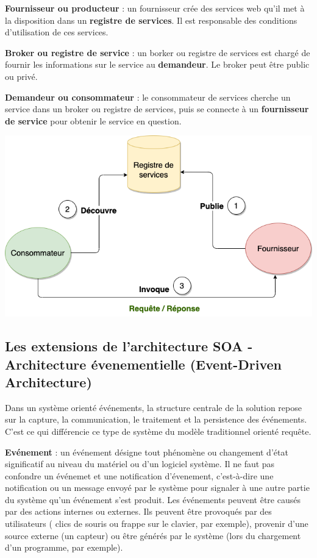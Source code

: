\documentclass[
]{book}
\theoremstyle{definition}
\theoremstyle{definition}
\theoremstyle{definition}
\theoremstyle{definition}
\theoremstyle{remark}
\begin{document}
\textbf{Fournisseur ou producteur} : un fournisseur crée des services web qu'il met à la disposition dans un \textbf{registre de services}. Il est responsable des conditions d'utilisation de ces services.

\textbf{Broker ou registre de service} : un borker ou registre de services est chargé de fournir les informations sur le service au \textbf{demandeur}. Le broker peut être public ou privé.

\textbf{Demandeur ou consommateur} : le consommateur de services cherche un service dans un broker ou registre de services, puis se connecte à un \textbf{fournisseur de service} pour obtenir le service en question.

\begin{center}\includegraphics[width=0.7\linewidth]{roles} \end{center}

\hypertarget{les-extensions-de-larchitecture-soa---architecture-uxe9venementielle-event-driven-architecture}{%
\subsection{Les extensions de l'architecture SOA - Architecture évenementielle (Event-Driven Architecture)}\label{les-extensions-de-larchitecture-soa---architecture-uxe9venementielle-event-driven-architecture}}

Dans un système orienté événements, la structure centrale de la solution repose sur la capture, la communication, le traitement et la persistence des événements. C'est ce qui différencie ce type de système du modèle traditionnel orienté requête.

\textbf{Evénement} : un événement désigne tout phénomène ou changement d'état significatif au niveau du matériel ou d'un logiciel système. Il ne faut pas confondre un événemet et une notification d'évenement, c'est-à-dire une notification ou un message envoyé par le système pour signaler à une autre partie du système qu'un événement s'est produit.
Les événements peuvent être causés par des actions internes ou externes. Ils peuvent être provoqués par des utilisateurs ( clics de souris ou frappe sur le clavier, par exemple), provenir d'une source externe (un capteur) ou être générés par le système (lors du chargement d'un programme, par exemple).
\end{document}

